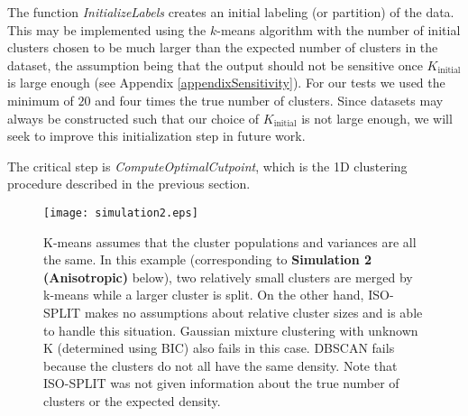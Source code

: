 \documentclass[10pt]{article}
\begin{document}

The function \emph{InitializeLabels} creates an initial labeling (or partition) of the data. This may be implemented using the $k$-means algorithm with the number of initial clusters chosen to be much larger than the expected number of clusters in the dataset, the assumption being that the output should not be sensitive once $K_\text{initial}$ is large enough (see Appendix \ref{appendixSensitivity}). For our tests we used the minimum of $20$ and four times the true number of clusters. Since datasets may always be constructed such that our choice of $K_\text{initial}$ is not large enough, we will seek to improve this initialization step in future work.

The critical step is \emph{ComputeOptimalCutpoint}, which is the 1D clustering procedure described in the previous section.


\begin{figure}
\begin{center}
\texttt{[image: simulation2.eps]}
\end{center}
\caption{
K-means assumes that the cluster populations and variances are all the same. In this example (corresponding to \textbf{Simulation 2 (Anisotropic)} below), two relatively small clusters are merged by k-means while a larger cluster is split. On the other hand, ISO-SPLIT makes no assumptions about relative cluster sizes and is able to handle this situation. Gaussian mixture clustering with unknown K (determined using BIC) also fails in this case. DBSCAN fails because the clusters do not all have the same density. Note that ISO-SPLIT was not given information about the true number of clusters or the expected density.
}
\label{fig:simulation2}
\end{figure}
\end{document}
